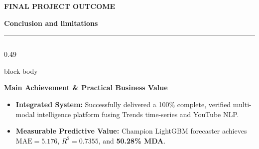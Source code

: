 \documentclass[aspectratio=169, 10pt]{beamer}
\newcommand{\slideheader}[3]{%
        \vspace{-0.25cm}%
        \noindent\begin{minipage}[t]{0.88\linewidth}%
            {\fontsize{7pt}{8.5pt}\selectfont \textbf{\color{BlueAccent}#1}}\par\vspace{1pt}%
            {\fontsize{11.5pt}{13.5pt}\selectfont \textbf{\color{NavyPrimary}#2}}%
        \end{minipage}%
        \hfill%
        \begin{minipage}[t]{0.10\linewidth}%
            \raggedleft{\fontsize{12pt}{14pt}\selectfont \textbf{\color{CoralAccent}#3}}%
        \end{minipage}\par%
        \vspace{2pt}%
        \textcolor{CardBorder}{\rule{\linewidth}{0.6pt}}\par%
        \vspace{3pt}%
    }
\newenvironment{card}[1][]{%
        \begin{beamercolorbox}[rounded=true,shadow=false,wd=\linewidth,sep=3.5pt,#1]{block body}%
        \fontsize{7.8pt}{9.8pt}\selectfont%
    }{%
        \end{beamercolorbox}%
    }
\begin{document}
    \begin{frame}[t]                                                                                                                                                                                   
        \slideheader{FINAL PROJECT OUTCOME}{Conclusion and limitations}{17}                                                                                                                            
        \begin{columns}[T]                                                                                                                                                                             
            \begin{column}{0.49\textwidth}                                                                                                                                                             
                \begin{card}                                                                                                                                                                           
                    {\fontsize{8pt}{9.5pt}\selectfont \textbf{\color{NavyPrimary}Main Achievement \& Practical Business Value}}\\[0.06cm]                                                              
                    \begin{itemize}\setlength{\itemsep}{2pt}                                                                                                                                           
                        \item \textbf{Integrated System:} Successfully delivered a 100\% complete, verified multi-modal intelligence platform fusing Trends time-series and YouTube NLP.               
                        \item \textbf{Measurable Predictive Value:} Champion LightGBM forecaster achieves \textbf{$\text{MAE} = 5.176$}, \textbf{$R^2 = 0.7355$}, and \textbf{50.28\% MDA}.                                                                                                                                                    

\end{itemize}
\end{card}
\end{column}
\end{columns}
\end{frame}
\end{document}
